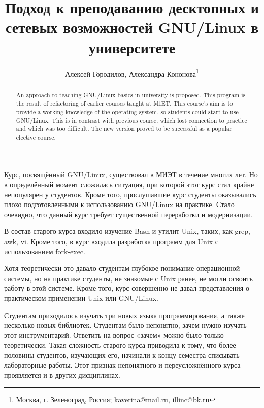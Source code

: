 \documentclass[10pt, a5paper]{article}
\begin{document}
\title{Подход к преподаванию десктопных и сетевых возможностей GNU/Linux в университете}%

\author{Алексей Городилов, Александра Кононова\footnote{Москва, г. Зеленоград, Россия; \url{kaverina@mail.ru}, \url{illinc@bk.ru}}}
\maketitle

\begin{abstract}
An approach to teaching GNU/Linux basics in university is proposed. This program is the result of refactoring of earlier courses taught at MIET. This course's aim is to provide a working knowledge of the operating system, so students could start to use GNU/Linux. This is in contrast with previous course, which lost connection to practice and which was too difficult. The new version proved to be successful as a popular elective course.
\end{abstract}
Курс, посвящённый GNU/Linux, существовал в МИЭТ в течение многих лет. Но в определённый момент сложилась ситуация, при которой этот курс стал крайне непопулярен у студентов. Кроме того, прослушавшие курс студенты оказывались плохо подготовленными к использованию GNU/Linux на практике. Стало очевидно, что данный курс требует существенной переработки и модернизации.

В состав старого курса входило изучение Bash и утилит Unix, таких, как grep, awk, vi. Кроме того, в курс входила разработка программ для Unix с использованием fork-exec.

Хотя теоретически это давало студентам глубокое понимание операционной системы, но на практике студенты, не знакомые с Unix ранее, не могли освоить работу в этой системе. Кроме того, курс совершенно не давал представления о практическом применении Unix или GNU/Linux.

Студентам приходилось изучать три новых языка программирования, а также несколько новых библиотек.  Студентам было непонятно, зачем нужно изучать этот инструментарий. Ответить на вопрос «зачем» можно было только теоретически. Такая сложность  старого курса приводила к тому, что более половины студентов, изучающих его, начинали к концу семестра списывать лабораторные работы. Этот признак непонятного и переусложнённого курса проявляется и в других дисциплинах.
\end{document}
